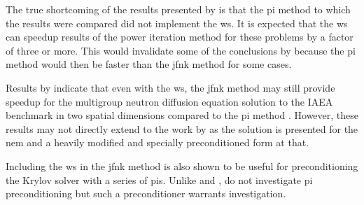      The true shortcoming of the results presented by \citeauthor{qe2paper} is
      that the \gls{pi} method to which the results were compared did not
      implement the \gls{ws}. It is expected that the \gls{ws} can speedup
      results of the power iteration method for these problems by a factor of
      three or more. This would invalidate some of the conclusions by
      \citeauthor{qe2paper} because the \gls{pi} method would then be faster
      than the \gls{jfnk} method for some cases.

      Results by \citeauthor{jfnk_wielandt} indicate that even with the
      \gls{ws}, the \gls{jfnk} method may still provide speedup for the
      multigroup neutron diffusion equation solution to the IAEA benchmark in
      two spatial dimensions compared to the \gls{pi} method
      \cite{jfnk_wielandt}. However, these results may not directly extend to
      the work by \citeauthor{qe2paper} as the solution is presented for the
      \gls{nem} and a heavily modified and specially preconditioned form at
      that.

      Including the \gls{ws} in the \gls{jfnk} method is also shown to be useful
      for preconditioning the Krylov solver with a series of \glspl{pi}. Unlike
      \citeauthor{gill_azmy} and \citeauthor{jfnk_wielandt},
      \citeauthor{qe2paper} do not investigate \gls{pi} preconditioning but
      such a preconditioner warrants investigation.
